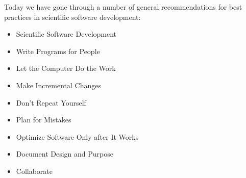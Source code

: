 \documentclass[english]{beamer}
\newcommand{\sectionslide}{\centering\vspace*{25mm}%
  {\bfseries\LARGE \insertsection}}
\begin{document}
\begin{frame}
  \sectionslide
\end{frame}


\begin{frame}{\insertsection}
  Today we have gone through a number of general recommendations for
  best practices in scientific software development:
  \begin{itemize}
  \item Scientific Software Development
  \item Write Programs for People
  \item Let the Computer Do the Work
  \item Make Incremental Changes
  \item Don’t Repeat Yourself
  \item Plan for Mistakes
  \item Optimize Software Only after It Works
  \item Document Design and Purpose
  \item Collaborate
  \end{itemize}
\end{frame}

\end{document}
